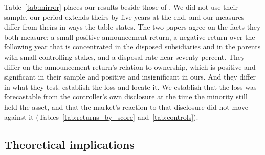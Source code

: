 Table~\ref{tab:mirror} places our results beside those of . We did not use their sample, our period extends theirs by five years at the end, and our measures differ from theirs in ways the table states. The two papers agree on the facts they both measure: a small positive announcement return, a negative return over the following year that is concentrated in the disposed subsidiaries and in the parents with small controlling stakes, and a disposal rate near seventy percent. They differ on the announcement return's relation to ownership, which is positive and significant in their sample and positive and insignificant in ours. And they differ in what they test.  establish the loss and locate it. We establish that the loss was forecastable from the controller's own disclosure at the time the minority still held the asset, and that the market's reaction to that disclosure did not move against it (Tables~\ref{tab:returns_by_score} and~\ref{tab:controls}).

\begin{table}[htbp]
\centering
\caption{The tests of \protect{} and their counterparts in this paper}\label{tab:mirror}
{\footnotesize\setlength{\tabcolsep}{3pt}}
\end{table}

\subsection{Theoretical implications}\label{sec:theoretical}

